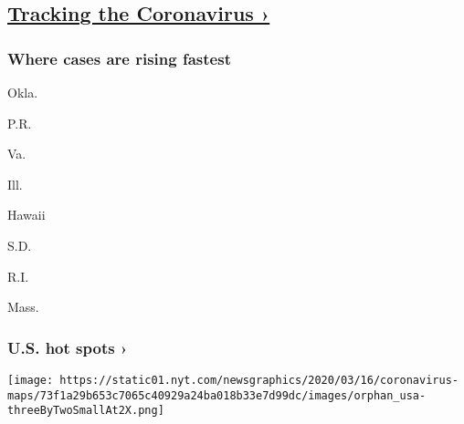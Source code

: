 \hypertarget{tracking-the-coronavirus-}{%
\subsection{\texorpdfstring{\href{https://www.nytimes.com/interactive/2020/us/coronavirus-us-cases.html}{Tracking
the Coronavirus
›}}{Tracking the Coronavirus ›}}\label{tracking-the-coronavirus-}}

\href{https://www.nytimes.com/interactive/2020/us/coronavirus-us-cases.html}{}

\hypertarget{where-cases-are-rising-fastest}{%
\subsubsection{\texorpdfstring{Where cases are \textbf{rising}
fastest}{Where cases are rising fastest}}\label{where-cases-are-rising-fastest}}

\href{https://www.nytimes.com/interactive/2020/us/oklahoma-coronavirus-cases.html}{}

Okla.
\href{https://www.nytimes.com/interactive/2020/us/puerto-rico-coronavirus-cases.html}{}

P.R.
\href{https://www.nytimes.com/interactive/2020/us/virginia-coronavirus-cases.html}{}

Va.
\href{https://www.nytimes.com/interactive/2020/us/illinois-coronavirus-cases.html}{}

Ill.
\href{https://www.nytimes.com/interactive/2020/us/hawaii-coronavirus-cases.html}{}

Hawaii
\href{https://www.nytimes.com/interactive/2020/us/south-dakota-coronavirus-cases.html}{}

S.D.
\href{https://www.nytimes.com/interactive/2020/us/rhode-island-coronavirus-cases.html}{}

R.I.
\href{https://www.nytimes.com/interactive/2020/us/massachusetts-coronavirus-cases.html}{}

Mass.

\href{https://www.nytimes.com/interactive/2020/us/coronavirus-us-cases.html}{}

\hypertarget{us-hot-spots-}{%
\subsubsection{U.S. hot spots ›}\label{us-hot-spots-}}

\texttt{[image: https://static01.nyt.com/newsgraphics/2020/03/16/coronavirus-maps/73f1a29b653c7065c40929a24ba018b33e7d99dc/images/orphan\_usa-threeByTwoSmallAt2X.png]}
\href{https://www.nytimes.com/interactive/2020/world/coronavirus-maps.html}{}

